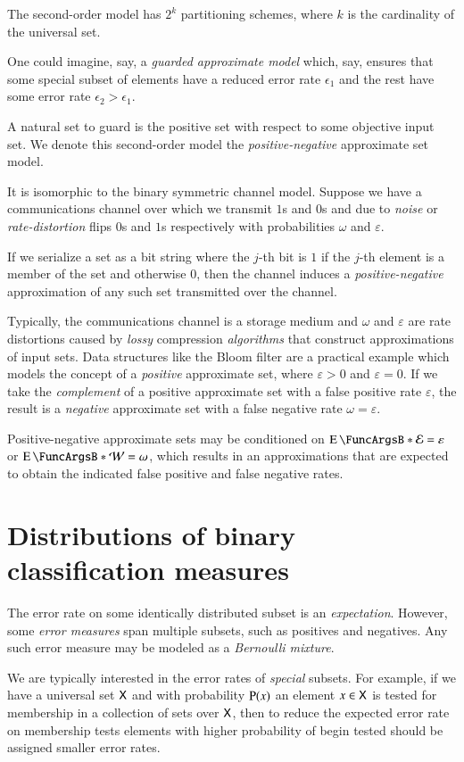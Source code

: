 \documentclass[10pt,final,hidelinks]{article}
\numberwithin{equation}{section}
\newcommand{\FNR}{\mathcal{W}}
\newcommand{\FPR}{\mathcal{E}}
\newcommand{\fprate}{\varepsilon}
\newcommand{\fnrate}{\omega}
\theoremstyle{plain}
\begin{document}
The second-order model has $2^k$ partitioning schemes, where $k$ is the cardinality of the universal set.

One could imagine, say, a \emph{guarded approximate model} which, say, ensures that some special subset of elements have a reduced error rate $\epsilon_1$ and the rest have some error rate $\epsilon_2 > \epsilon_1$.

A natural set to guard is the positive set with respect to some objective input set.
We denote this second-order model the \emph{positive-negative} approximate set model.

It is isomorphic to the binary symmetric channel model.
Suppose we have a communications channel over which we transmit $1$s and $0$s and due to \emph{noise} or \emph{rate-distortion} flips $0$s and $1$s respectively with probabilities $\fnrate$ and $\fprate$.

If we serialize a set as a bit string where the $j$-th bit is $1$ if the $j$-th element is a member of the set and otherwise $0$, then the channel induces a \emph{positive-negative} approximation of any such set transmitted over the channel.

Typically, the communications channel is a storage medium and $\fnrate$ and $\fprate$ are rate distortions caused by \emph{lossy} compression \emph{algorithms} that construct approximations of input sets.
Data structures like the Bloom filter are a practical example which models the concept of a \emph{positive} approximate set, where $\fprate > 0$ and $\fprate = 0$.
If we take the \emph{complement} of a positive approximate set with a false positive rate $\fprate$, the result is a \emph{negative} approximate set with a false negative rate $\fnrate = \fprate$.

Positive-negative approximate sets may be conditioned on $\Expect{\FPR} = \fprate$ or $\Expect{\FNR} = \fnrate$, which results in an approximations that are expected to obtain the indicated false positive and false negative rates.
\section{Distributions of binary classification measures}
\label{sec:characteristics}
The error rate on some identically distributed subset is an \emph{expectation}.
However, some \emph{error measures} span multiple subsets, such as positives and negatives.
Any such error measure may be modeled as a \emph{Bernoulli mixture}.

We are typically interested in the error rates of \emph{special} subsets.
For example, if we have a universal set $\Set{X}$ and with probability $\Fun{P}(x)$ an element $x \in \Set{X}$ is tested for membership in a collection of sets over $\Set{X}$, then to reduce the expected error rate on membership tests elements with higher probability of begin tested should be assigned smaller error rates.
\end{document}
